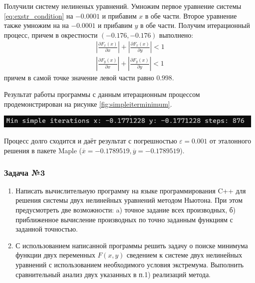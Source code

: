 \documentclass[a4paper, fontsize=14pt]{article}
\begin{document}
Получили систему нелиненых уравнений. Умножим первое уравнение системы \eqref{eq:exstr_condition} на  $-0.0001$ и прибавим $x$ в обе части.
Второе уравнение также умножим на на  $-0.0001$ и прибавим $y$ в обе части. Получим итерационный процесс, причем в окрестности $(-0.176, -0.176)$ выполнено:
\begin{equation*}
    \begin{aligned}
        &\left| \frac{\partial F_x(x)}{\partial x}  \right| +  \left| \frac{\partial F_x(x)}{\partial y} \right| < 1 \\
        &\left| \frac{\partial F_y(x)}{\partial x}  \right| +  \left| \frac{\partial F_y(x)}{\partial y} \right| < 1
    \end{aligned}
\end{equation*}
причем в самой точке значение левой части равно $0.998$. 

Результат работы программы с данным итерационным процессом продемонстрирован на рисунке \ref{fig:simpleiterminimum}.

\begin{center}
    \includegraphics[scale=0.8]{src/simple iter minimum.png}
    \label{fig:simpleiterminimum}
\end{center}

Процесс долго сходится и даёт результат с погрешностью $\varepsilon = 0.001$ от эталонного решения в пакете Maple ($\overline{x} = -0.1789519, \overline{y} = -0.1789519$).

\subsubsection*{Задача №3}
\begin{enumerate}
    \item Написать вычислительную программу на языке программирования C++
    для решения системы двух нелинейных уравнений методом Ньютона. При
    этом предусмотреть две возможности: a) точное задание всех
    производных, б) приближенное вычисление производных по точно
    заданным функциям с заданной точностью.
    \item С использованием написанной программы решить задачу о поиске
    минимума функции двух переменных $F(x,y)$ сведением к системе двух
    нелинейных уравнений с использованием необходимого условия
    экстремума. Выполнить сравнительный анализ двух указанных в п.1)
    реализаций метода.
\end{enumerate}
\end{document}

